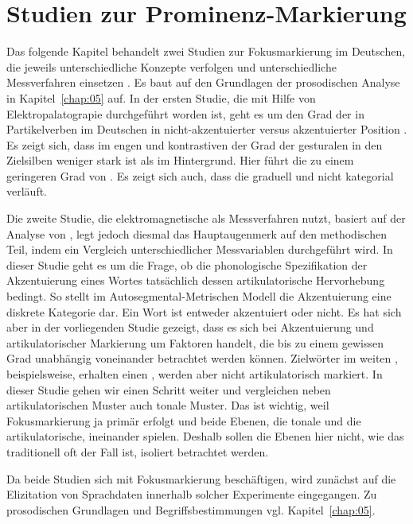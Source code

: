 \chapter{Studien zur Prominenz-Markierung}
\label{chap:06}

Das folgende Kapitel behandelt zwei Studien zur Fokusmarkierung im Deutschen, die jeweils unterschiedliche Konzepte verfolgen und unterschiedliche Messverfahren einsetzen \citep[vgl.][]{Mücke2008c, Mücke2014b}. Es baut auf den Grundlagen der prosodischen Analyse in Kapitel~\ref{chap:05} auf. In der ersten Studie, die mit Hilfe von Elektropalatograpie durchgeführt worden ist, geht es um den Grad der  in Partikelverben im Deutschen in nicht-akzentuierter versus akzentuierter Position \citep{Mücke2008c}. Es zeigt sich, dass im engen und kontrastiven  der Grad der gesturalen  in den Zielsilben weniger stark ist als im Hintergrund. Hier führt die  zu einem geringeren Grad von . Es zeigt sich auch, dass die  graduell und nicht kategorial verläuft.  

Die zweite Studie, die elektromagnetische  als Messverfahren nutzt, basiert auf der Analyse von \citet{Mücke2014b}, legt jedoch diesmal das Hauptaugenmerk auf den methodischen Teil, indem ein Vergleich unterschiedlicher Messvariablen durchgeführt wird. In dieser Studie geht es um die Frage, ob die phonologische Spezifikation der Akzentuierung eines Wortes tatsächlich dessen artikulatorische Hervorhebung bedingt. So stellt im Autosegmental-Metrischen Modell die Akzentuierung eine diskrete Kategorie dar. Ein Wort ist entweder akzentuiert oder nicht. Es hat sich aber in der vorliegenden Studie gezeigt, dass es sich bei Akzentuierung und artikulatorischer Markierung um Faktoren handelt, die bis zu einem gewissen Grad unabhängig voneinander betrachtet werden können. Zielwörter im weiten , beispielsweise, erhalten einen , werden aber nicht artikulatorisch markiert. In dieser Studie gehen wir einen Schritt weiter und vergleichen neben artikulatorischen Muster auch tonale Muster. Das ist wichtig, weil Fokusmarkierung ja primär  erfolgt und beide Ebenen, die tonale und die artikulatorische, ineinander spielen. Deshalb sollen die Ebenen hier nicht, wie das traditionell oft der Fall ist, isoliert betrachtet werden.

Da beide Studien sich mit Fokusmarkierung beschäftigen, wird zunächst auf die Elizitation von Sprachdaten innerhalb solcher Experimente eingegangen. Zu prosodischen Grundlagen und Begriffsbestimmungen vgl. Kapitel~\ref{chap:05}. 

